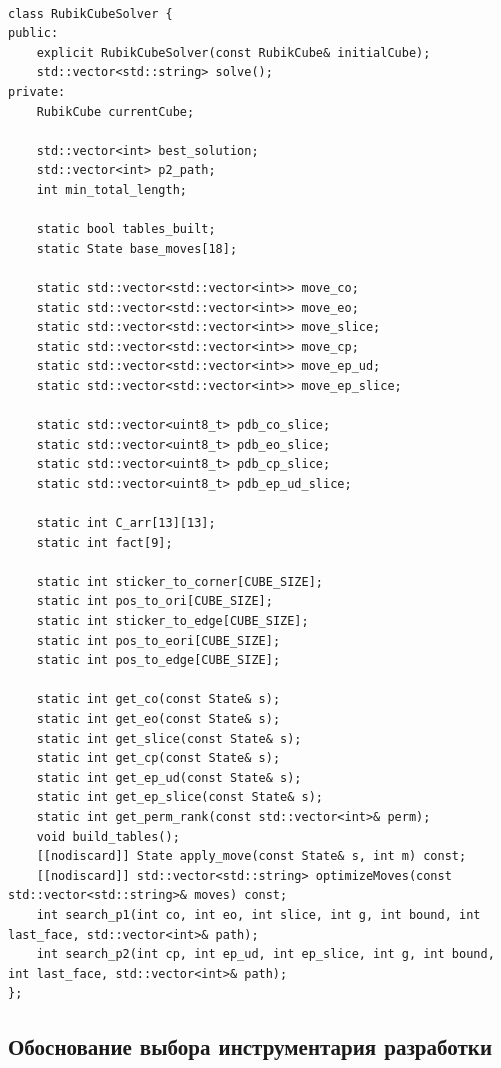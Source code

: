 \documentclass{article}
\begin{document}
\begin{lstlisting}[caption={Интерфейс класса решателя}, label={lst:cube_h}]

class RubikCubeSolver {
public:
    explicit RubikCubeSolver(const RubikCube& initialCube);
    std::vector<std::string> solve();
private:
    RubikCube currentCube;

    std::vector<int> best_solution;
    std::vector<int> p2_path;
    int min_total_length;

    static bool tables_built;
    static State base_moves[18];

    static std::vector<std::vector<int>> move_co;
    static std::vector<std::vector<int>> move_eo;
    static std::vector<std::vector<int>> move_slice;
    static std::vector<std::vector<int>> move_cp;
    static std::vector<std::vector<int>> move_ep_ud;
    static std::vector<std::vector<int>> move_ep_slice;

    static std::vector<uint8_t> pdb_co_slice;
    static std::vector<uint8_t> pdb_eo_slice;
    static std::vector<uint8_t> pdb_cp_slice;
    static std::vector<uint8_t> pdb_ep_ud_slice;

    static int C_arr[13][13];
    static int fact[9];

    static int sticker_to_corner[CUBE_SIZE];
    static int pos_to_ori[CUBE_SIZE];
    static int sticker_to_edge[CUBE_SIZE];
    static int pos_to_eori[CUBE_SIZE];
    static int pos_to_edge[CUBE_SIZE];

    static int get_co(const State& s);
    static int get_eo(const State& s);
    static int get_slice(const State& s);
    static int get_cp(const State& s);
    static int get_ep_ud(const State& s);
    static int get_ep_slice(const State& s);
    static int get_perm_rank(const std::vector<int>& perm);
    void build_tables();
    [[nodiscard]] State apply_move(const State& s, int m) const;
    [[nodiscard]] std::vector<std::string> optimizeMoves(const std::vector<std::string>& moves) const;
    int search_p1(int co, int eo, int slice, int g, int bound, int last_face, std::vector<int>& path);
    int search_p2(int cp, int ep_ud, int ep_slice, int g, int bound, int last_face, std::vector<int>& path);
};

\end{lstlisting}

\subsection{Обоснование выбора инструментария разработки}
\end{document}
